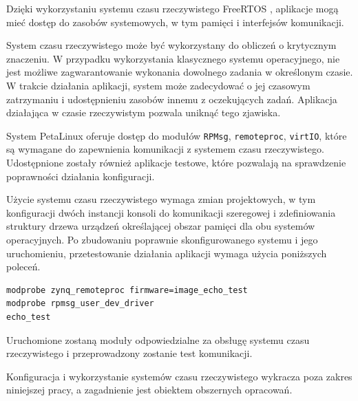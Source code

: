 Dzięki wykorzystaniu systemu czasu rzeczywistego FreeRTOS \cite{freeRTOS-home}, aplikacje mogą mieć dostęp do zasobów systemowych, w tym pamięci i interfejsów komunikacji.

System czasu rzeczywistego może być wykorzystany do obliczeń o krytycznym znaczeniu. W przypadku wykorzystania klasycznego systemu operacyjnego, nie jest możliwe zagwarantowanie wykonania dowolnego zadania w określonym czasie. W trakcie działania aplikacji, system może zadecydować o jej czasowym zatrzymaniu i udostępnieniu zasobów innemu z oczekujących zadań. Aplikacja działająca w czasie rzeczywistym pozwala uniknąć tego zjawiska.

System PetaLinux oferuje dostęp do modułów \texttt{RPMsg}, \texttt{remoteproc}, \texttt{virtIO}, które są wymagane do zapewnienia komunikacji z systemem czasu rzeczywistego. Udostępnione zostały również aplikacje testowe, które pozwalają na sprawdzenie poprawności działania konfiguracji.

Użycie systemu czasu rzeczywistego wymaga zmian projektowych, w tym konfiguracji dwóch instancji konsoli do komunikacji szeregowej i zdefiniowania struktury drzewa urządzeń określającej obszar pamięci dla obu systemów operacyjnych. Po zbudowaniu poprawnie skonfigurowanego systemu i jego uruchomieniu, przetestowanie działania aplikacji wymaga użycia poniższych poleceń.

\begin{lstlisting}[breaklines=true]
modprobe zynq_remoteproc firmware=image_echo_test
modprobe rpmsg_user_dev_driver
echo_test
\end{lstlisting}

Uruchomione zostaną moduły odpowiedzialne za obsługę systemu czasu rzeczywistego i przeprowadzony zostanie test komunikacji.

Konfiguracja i wykorzystanie systemów czasu rzeczywistego wykracza poza zakres niniejszej pracy, a zagadnienie jest obiektem obszernych opracowań. \cite{adam-taylor-openamp,zynq-openamp-gsg}